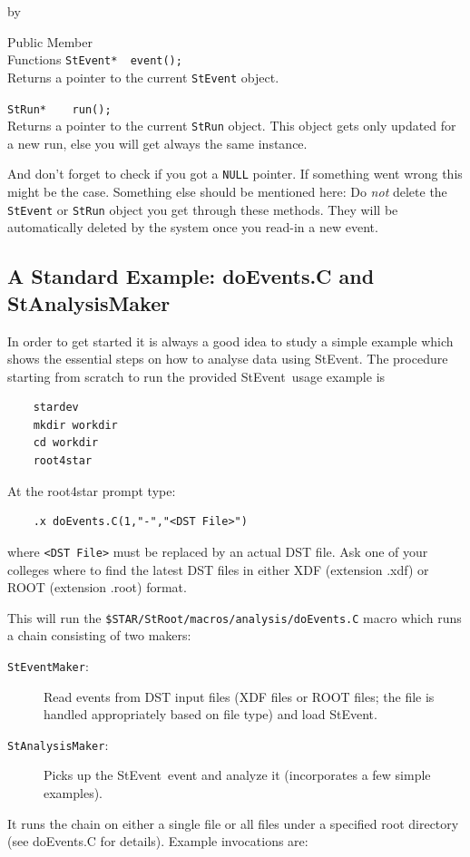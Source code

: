 \documentclass[twoside]{article}
\newcommand{\StEvent}{\textsf{StEvent}}
\newcommand{\entrylabel}[1]{\mbox{\textbf{{#1}}}\hfil}%
\newenvironment{entry}
{\begin{list}{}%
    {\renewcommand{\makelabel}{\entrylabel}%
     \setlength{\labelwidth}{90pt}%
     \setlength{\leftmargin}{\labelwidth}
     \advance\leftmargin by \labelsep%
      }%
    }%
  {\end{list}}
\newcommand{\Entrylabel}[1]%
{\raisebox{0pt}[1ex][0pt]{\makebox[\labelwidth][l]%
    {\parbox[t]{\labelwidth}{\hspace{0pt}\textbf{{#1}}}}}}
\newenvironment{Entry}%
{\renewcommand{\entrylabel}{\Entrylabel}\begin{entry}}%
  {\end{entry}}
\begin{document}
\begin{Entry}
\item[Public Member\\ Functions]
    \verb+StEvent*  event();+\\
    Returns a pointer to the current \texttt{StEvent} object.
    
    \verb+StRun*    run();+\\
    Returns a pointer to the current \texttt{StRun} object.  This
    object gets only updated for a new run, else you will get always
    the same instance.
\end{Entry}

And don't forget to check if you got a \texttt{NULL} pointer. If
something went wrong this might be the case. Something else should be
mentioned here: Do \emph{not} delete the \texttt{StEvent} or
\texttt{StRun} object you get through these methods.  They will be
automatically deleted by the system once you read-in a new event.
\vfill

\subsection{A Standard Example: doEvents.C and StAnalysisMaker}
\label{sec:doEvents}
  
  

In order to get started it is always a good idea to study a simple
example which shows the essential steps on how to analyse data using
\StEvent.  The procedure starting from scratch to run the provided
\StEvent\ usage example is
\begin{verbatim}
    stardev
    mkdir workdir
    cd workdir
    root4star
\end{verbatim}
At the root4star prompt type:
\begin{verbatim}
    .x doEvents.C(1,"-","<DST File>")
\end{verbatim}
where \texttt{<DST File>} must be replaced by an actual DST file. Ask
one of your colleges where to find the latest DST files in either XDF
(extension .xdf) or ROOT (extension .root) format.

This will run the \texttt{\$STAR/StRoot/macros/analysis/doEvents.C}
macro which runs a chain consisting of two makers:
\begin{description}
\item[\texttt{StEventMaker}:] Read events from DST input files (XDF
    files or ROOT files; the file is handled appropriately based on
    file type) and load \StEvent.
\item[\texttt{StAnalysisMaker}:] Picks up the \StEvent\ event and
    analyze it (incorporates a few simple examples).
\end{description}
It runs the chain on either a single file or all files under a
specified root directory (see doEvents.C for details). Example
invocations are:
\end{document}
